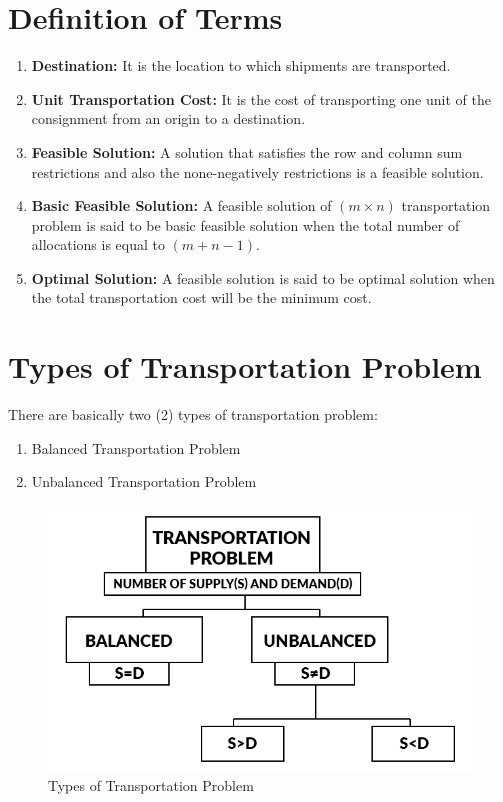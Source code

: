 \documentclass[12pt]{report}
\newcommand{\bt}[1]{\textbf{#1}}
\newcommand{\tp}{Transportation Problem }
\begin{document}
	\section{Definition of Terms}
	\begin{enumerate}
		\item \bt{Destination:} It is the location to which shipments are transported.
		\item \bt{Unit Transportation Cost:} It is the cost of transporting one unit of the consignment from an origin to a destination.
		\item \bt{Feasible Solution:} A solution that satisfies the row and column sum restrictions and also the none-negatively restrictions is a feasible solution.
		\item\bt{Basic Feasible Solution:} A feasible solution of $(m\times n)$ transportation problem is said to be basic feasible solution when the total number of allocations is equal to $(m+n-1)$.
		\item\bt{Optimal Solution:} A feasible solution is said to be optimal solution when the total transportation cost will be the minimum cost.
	\end{enumerate}
	
	
	
	
	\section{Types of Transportation Problem}
	There are basically two (2) types of transportation problem:
	\begin{enumerate}
		\item Balanced \tp\\[-1.1cm]
		\item Unbalanced \tp \\[-1.3cm]
	\end{enumerate}
	\begin{figure}[!h]
		\centering
		\includegraphics[width=0.51\linewidth]{tt4}
		\caption{Types of Transportation Problem}
		\label{fig:1_1}
	\end{figure}
	
\end{document}
